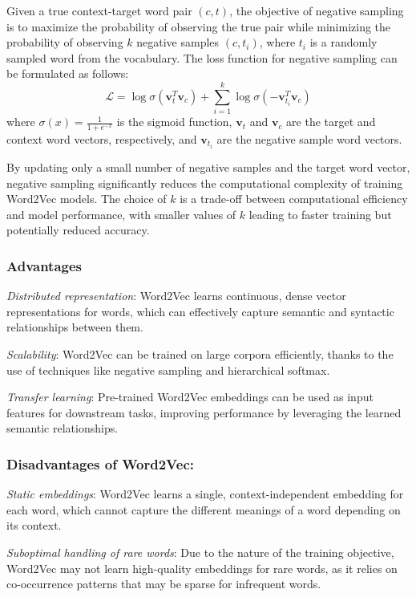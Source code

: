 \documentclass[12pt]{article}
\begin{document}
Given a true context-target word pair $(c, t)$, the objective of negative sampling is to maximize the probability of observing the true pair while minimizing the probability of observing $k$ negative samples $(c, t_i)$, where $t_i$ is a randomly sampled word from the vocabulary. The loss function for negative sampling can be formulated as follows:
\begin{equation}
\mathcal{L} = \log \sigma(\mathbf{v}_t^T \mathbf{v}_c) + \sum_{i=1}^{k} \log \sigma(-\mathbf{v}_{t_i}^T \mathbf{v}_c)
\end{equation}
where $\sigma(x) = \frac{1}{1 + e^{-x}}$ is the sigmoid function, $\mathbf{v}_t$ and $\mathbf{v}_c$ are the target and context word vectors, respectively, and $\mathbf{v}_{t_i}$ are the negative sample word vectors.

By updating only a small number of negative samples and the target word vector, negative sampling significantly reduces the computational complexity of training Word2Vec models. The choice of $k$ is a trade-off between computational efficiency and model performance, with smaller values of $k$ leading to faster training but potentially reduced accuracy.

\subsubsection{Advantages}
\textit{Distributed representation}: Word2Vec learns continuous, dense vector representations for words, which can effectively capture semantic and syntactic relationships between them.

\textit{Scalability}: Word2Vec can be trained on large corpora efficiently, thanks to the use of techniques like negative sampling and hierarchical softmax.

\textit{Transfer learning}: Pre-trained Word2Vec embeddings can be used as input features for downstream tasks, improving performance by leveraging the learned semantic relationships.

\subsubsection{Disadvantages of Word2Vec:}
\textit{Static embeddings}: Word2Vec learns a single, context-independent embedding for each word, which cannot capture the different meanings of a word depending on its context.

\textit{Suboptimal handling of rare words}: Due to the nature of the training objective, Word2Vec may not learn high-quality embeddings for rare words, as it relies on co-occurrence patterns that may be sparse for infrequent words.
\end{document}
